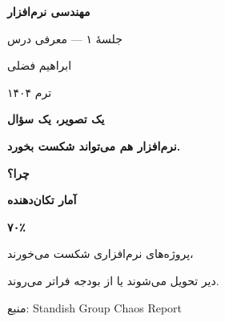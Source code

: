 \documentclass[14pt, a4paper, landscape]{extarticle}
\newcommand{\slide}[1]{%
    \newpage
    \begin{center}
    \begin{minipage}[t]{0.95\textwidth}
    \vspace{0.5cm}
    #1
    \vspace{0.5cm}
    \end{minipage}
    \end{center}
}
\newcommand{\slidetitle}[1]{%
    \begin{center}
        {\LARGE\bfseries\textcolor{primary}{#1}}
    \end{center}
    \vspace{0.5cm}
}
\newcommand{\myaccent}[1]{\textcolor{accent}{#1}}
\begin{document}
\pagestyle{empty}


\begin{center}
    \vspace*{4cm}
    {\color{white}\Huge\bfseries مهندسی نرم‌افزار}
    
    \vspace{1cm}
    
    {\color{accent}\LARGE جلسهٔ ۱ — معرفی درس}
    
    \vspace{2cm}
    
    {\color{white}\Large ابراهیم فضلی}
    
    \vspace{0.5cm}
    
    {\color{white}\large ترم ۱۴۰۴}
\end{center}

\pagestyle{fancy}

\slide{
    \slidetitle{یک تصویر، یک سؤال}
    \vspace{1.5cm}
    \begin{center}
        {\Large\bfseries نرم‌افزار هم می‌تواند شکست بخورد.}
        
        \vspace{1.5cm}
        
        {\Huge\bfseries\myaccent{چرا؟}}
    \end{center}
}

\slide{
    \slidetitle{آمار تکان‌دهنده}
    \vspace{1cm}
    \begin{center}
        {\fontsize{80}{90}\selectfont\bfseries\myaccent{۷۰٪}}
        
        \vspace{1cm}
        
        {\Large پروژه‌های نرم‌افزاری شکست می‌خورند،}
        
        {\Large دیر تحویل می‌شوند یا از بودجه فراتر می‌روند.}
        
        \vspace{1.5cm}
        
        {\small منبع: Standish Group Chaos Report}
    \end{center}
}
\end{document}
